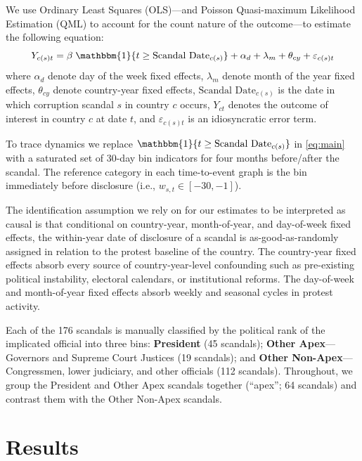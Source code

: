 \documentclass[11pt]{article}
\let\mathbetasym\beta
\renewcommand{\beta}{\ensuremath{\mathbetasym}}
\begin{document}
We use Ordinary Least Squares (OLS)---and Poisson Quasi-maximum Likelihood Estimation (QML) to account for the count nature of the outcome---to estimate the following equation:
\begin{equation}
\label{eq:main}
    Y_{c(s)t} = \beta \; \mathbbm{1}\{t \geq \text{Scandal Date}_{c(s)}\} + \alpha_{d} + \lambda_{m} + \theta_{cy} + \varepsilon_{c(s)t}
\end{equation}
where $\alpha_d$ denote day of the week fixed effects, $\lambda_m$ denote month of the year fixed effects, $\theta_{cy}$ denote country-year fixed effects, $\text{Scandal Date}_{c(s)}$ is the date in which corruption scandal $s$ in country $c$ occurs, $Y_{ct}$ denotes the outcome of interest in country $c$ at date $t$, and $\varepsilon_{c(s)t}$ is an idiosyncratic error term.

To trace dynamics we replace $\mathbbm{1}\{t \geq \text{Scandal Date}_{c(s)}\}$ in \autoref{eq:main} with a saturated set of 30-day bin indicators for four months before/after the scandal.  The reference category in each time-to-event graph is the bin immediately before disclosure (i.e., $w_{s,t} \in [-30, -1]$).

The identification assumption we rely on for our estimates to be interpreted as causal is that conditional on country-year, month-of-year, and day-of-week fixed effects, the within-year date of disclosure of a scandal is as-good-as-randomly assigned in relation to the protest baseline of the country. The country-year fixed effects absorb every source of country-year-level confounding such as pre-existing political instability, electoral calendars, or institutional reforms. The day-of-week and month-of-year fixed effects absorb weekly and seasonal cycles in protest activity.

Each of the 176 scandals is manually classified by the political rank of the implicated official into three bins: \textbf{President} (45 scandals); \textbf{Other Apex}---Governors and Supreme Court Justices (19 scandals); and \textbf{Other Non-Apex}---Congressmen, lower judiciary, and other officials (112 scandals). Throughout, we group the President and Other Apex scandals together (``apex''; 64 scandals) and contrast them with the Other Non-Apex scandals.

\section{Results}
\end{document}
